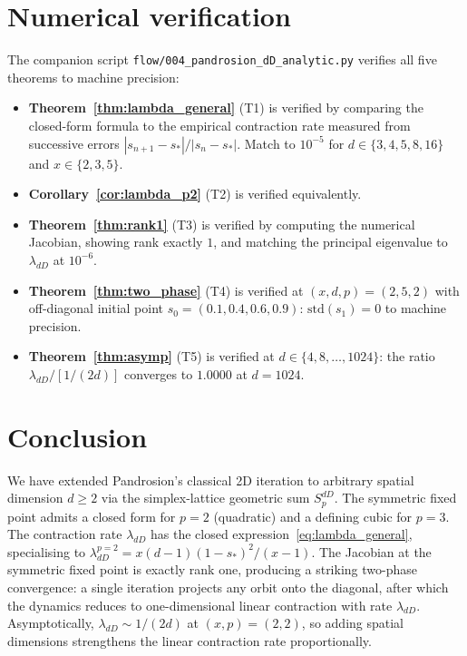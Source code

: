 \documentclass[11pt,a4paper]{article}
\theoremstyle{definition}
\theoremstyle{remark}
\begin{document}
\section{Numerical verification}
\label{sec:verify}

The companion script \texttt{flow/004\_pandrosion\_dD\_analytic.py}
verifies all five theorems to machine precision:

\begin{itemize}
\item \textbf{Theorem~\ref{thm:lambda_general}} (T1) is verified by
  comparing the closed-form formula to the empirical contraction rate
  measured from successive errors $|s_{n+1} - s_*|/|s_n - s_*|$.  Match
  to $10^{-5}$ for $d \in \{3, 4, 5, 8, 16\}$ and $x \in \{2, 3, 5\}$.
\item \textbf{Corollary~\ref{cor:lambda_p2}} (T2) is verified equivalently.
\item \textbf{Theorem~\ref{thm:rank1}} (T3) is verified by computing the
  numerical Jacobian, showing rank exactly $1$, and matching the
  principal eigenvalue to $\lambda_{dD}$ at $10^{-6}$.
\item \textbf{Theorem~\ref{thm:two_phase}} (T4) is verified at
  $(x, d, p) = (2, 5, 2)$ with off-diagonal initial point
  $s_0 = (0.1, 0.4, 0.6, 0.9)$: $\mathrm{std}(s_1) = 0$ to machine
  precision.
\item \textbf{Theorem~\ref{thm:asymp}} (T5) is verified at $d \in
  \{4, 8, \ldots, 1024\}$: the ratio $\lambda_{dD}/[1/(2d)]$ converges
  to $1.0000$ at $d = 1024$.
\end{itemize}

\section{Conclusion}

We have extended Pandrosion's classical 2D iteration to arbitrary
spatial dimension $d \geq 2$ via the simplex-lattice geometric sum
$S_p^{dD}$.  The symmetric fixed point admits a closed form for $p = 2$
(quadratic) and a defining cubic for $p = 3$.  The contraction rate
$\lambda_{dD}$ has the closed expression~\eqref{eq:lambda_general},
specialising to $\lambda_{dD}^{p=2} = x(d-1)(1-s_*)^2/(x-1)$.  The
Jacobian at the symmetric fixed point is exactly rank one, producing a
striking two-phase convergence: a single iteration projects any orbit
onto the diagonal, after which the dynamics reduces to one-dimensional
linear contraction with rate $\lambda_{dD}$.  Asymptotically,
$\lambda_{dD} \sim 1/(2d)$ at $(x, p) = (2, 2)$, so adding spatial
dimensions strengthens the linear contraction rate proportionally.
\end{document}
